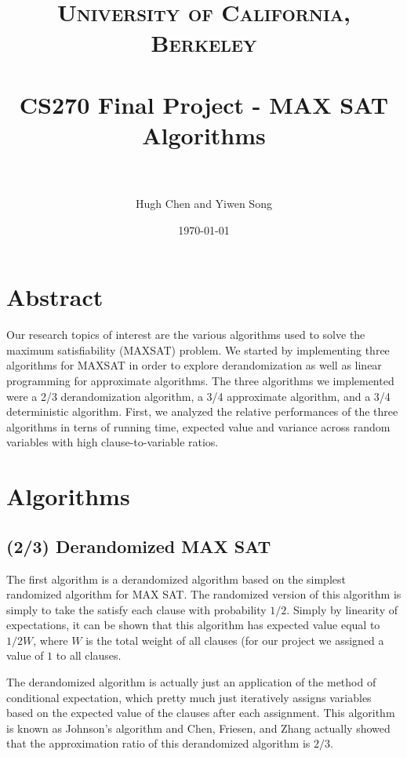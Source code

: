 \documentclass[paper=a4, fontsize=11pt]{scrartcl} %
\title{	
\normalfont \normalsize 
\textsc{University of California, Berkeley} \\ [25pt] %
\horrule{0.5pt} \\[0.4cm] %
\huge CS270 Final Project - MAX SAT Algorithms \\ %
\horrule{2pt} \\[0.5cm] %
}
\author{Hugh Chen and Yiwen Song} %
\date{\normalsize\today} %
\numberwithin{equation}{section} %
\numberwithin{figure}{section} %
\numberwithin{table}{section} %
\begin{document}
\maketitle %


\section{Abstract}

Our research topics of interest are the various algorithms used to solve the maximum satisfiability (MAXSAT) problem.  We started by implementing three algorithms for MAXSAT in order to explore derandomization as well as linear programming for approximate algorithms.  The three algorithms we implemented were a 2/3 derandomization algorithm, a 3/4 approximate algorithm, and a 3/4 deterministic algorithm.  First, we analyzed the relative performances of the three algorithms in terns of running time, expected value and variance across random variables with high clause-to-variable ratios.


\section{Algorithms}

\subsection{(2/3) Derandomized MAX SAT}

The first algorithm is a derandomized algorithm based on the simplest randomized algorithm for MAX SAT.  The randomized version of this algorithm is simply to take the satisfy each clause with probability $1/2$.  Simply by linearity of expectations, it can be shown that this algorithm has expected value equal to $1/2W$, where $W$ is the total weight of all clauses (for our project we assigned a value of $1$ to all clauses.  

The derandomized algorithm is actually just an application of the method of conditional expectation, which pretty much just iteratively assigns variables based on the expected value of the clauses after each assignment.  This algorithm is known as Johnson's algorithm \cite{Johnson1973} and Chen, Friesen, and Zhang \cite{Chenetal1999} actually showed that the approximation ratio of this derandomized algorithm is $2/3$.
\end{document}
